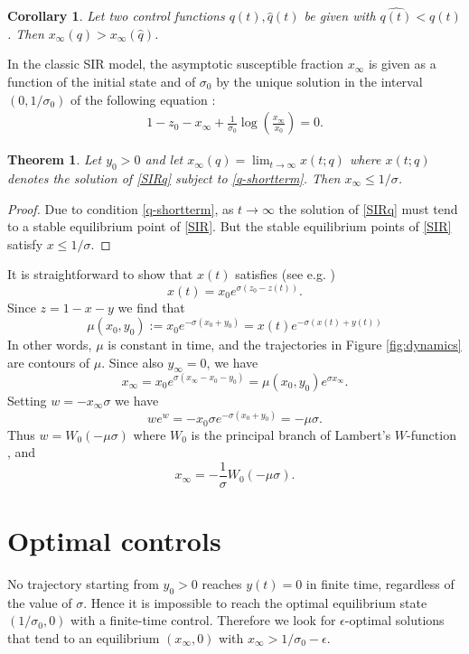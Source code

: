 \documentclass[english,12pt]{article}
\newtheorem{theorem}{Theorem}
\newtheorem{cor}{Corollary}
\newcommand{\Rnot}{\sigma_0}
\newcommand{\Sinf}{x_\infty}
\begin{document}
\begin{cor} \label{cor:diff-control}
Let two control functions $q(t), \hat{q}(t)$ be given with $\hat{q(t)}<q(t)$.
Then $x_\infty(q)>x_\infty(\hat{q})$.
\end{cor}

In the classic SIR model, the asymptotic susceptible fraction $\Sinf$ is
given as a function of the initial state and of $\Rnot$ by the unique solution 
in the interval $(0,1/\Rnot)$ of the
following equation \cite[Eqn. (5.4)]{hethcote1989three}:
\begin{align} \label{s-infty}
    1 - z_0 - \Sinf + \frac{1}{\Rnot} \log\left(\frac{\Sinf}{x_0}\right) = 0.
\end{align}

\begin{theorem}
Let $y_0>0$ and
let $\Sinf(q) = \lim_{t\to\infty} x(t;q)$ where $x(t;q)$ denotes the solution of
\eqref{SIRq} subject to \eqref{q-shortterm}.  Then $\Sinf\le 1/\sigma$.
\end{theorem}
\begin{proof}
Due to condition \eqref{q-shortterm}, as $t \to \infty$ the solution of \eqref{SIRq}
must tend to a stable equilibrium point of \eqref{SIR}.  But the stable equilibrium
points of \eqref{SIR} satisfy $x \le 1/\sigma$.
\end{proof}

It is straightforward to show that $x(t)$ satisfies (see e.g. \cite{harko2014exact,pakes2015lambert})
$$
    x(t) = x_0 e^{\sigma(z_0-z(t))}.
$$
Since $z=1-x-y$ we find that
$$
   \mu(x_0,y_0) := x_0 e^{-\sigma(x_0+y_0)} =  x(t) e^{-\sigma(x(t)+y(t))} 
$$
In other words, $\mu$ is constant in time, and the trajectories
in Figure \ref{fig:dynamics} are contours of $\mu$.
Since also $y_\infty=0$, we have
$$
    x_\infty = x_0 e^{\sigma(x_\infty-x_0-y_0)} = \mu(x_0,y_0) e^{\sigma x_\infty}.
$$
Setting $w=-x_\infty \sigma$ we have
$$
    we^w = -x_0 \sigma e^{-\sigma(x_0+y_0)} = -\mu \sigma.
$$
Thus $w = W_0(-\mu\sigma)$ where $W_0$ is the principal branch of Lambert's $W$-function \cite{pakes2015lambert},
and
$$
    x_\infty = -\frac{1}{\sigma}W_0(-\mu \sigma).
$$



\section{Optimal controls}
No trajectory starting from $y_0>0$ reaches $y(t)=0$ in finite time, regardless of the
value of $\sigma$.  Hence it is impossible to reach the optimal equilibrium state
$(1/\sigma_0,0)$ with a finite-time control.  Therefore we look for $\epsilon$-optimal
solutions that tend to an equilibrium $(x_\infty,0)$ with $x_\infty > 1/\sigma_0 - \epsilon$.
\end{document}
